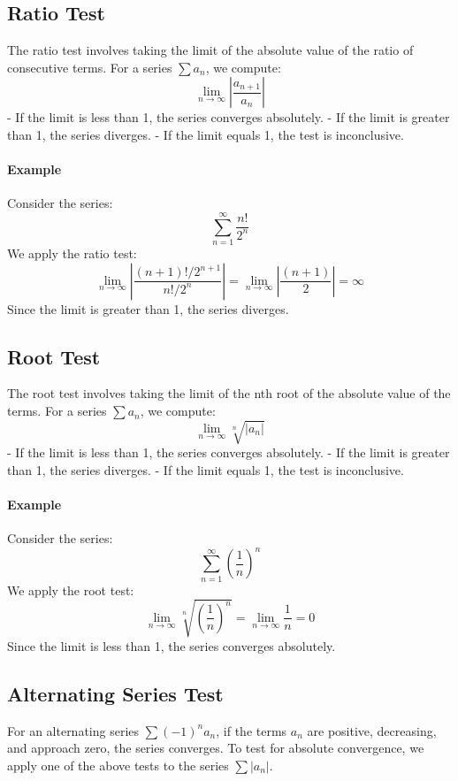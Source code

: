 \documentclass{article}
\begin{document}
\subsection*{Ratio Test}
The ratio test involves taking the limit of the absolute value of the ratio of consecutive terms. For a series \(\sum a_n\), we compute:
\[
\lim_{n \to \infty} \left| \frac{a_{n+1}}{a_n} \right|
\]
- If the limit is less than 1, the series converges absolutely.
- If the limit is greater than 1, the series diverges.
- If the limit equals 1, the test is inconclusive.

\paragraph{Example}
Consider the series:
\[
\sum_{n=1}^\infty \frac{n!}{2^n}
\]
We apply the ratio test:
\[
\lim_{n \to \infty} \left| \frac{(n+1)! / 2^{n+1}}{n! / 2^n} \right| = \lim_{n \to \infty} \left| \frac{(n+1)}{2} \right| = \infty
\]
Since the limit is greater than 1, the series diverges.

\subsection*{Root Test}
The root test involves taking the limit of the nth root of the absolute value of the terms. For a series \(\sum a_n\), we compute:
\[
\lim_{n \to \infty} \sqrt[n]{|a_n|}
\]
- If the limit is less than 1, the series converges absolutely.
- If the limit is greater than 1, the series diverges.
- If the limit equals 1, the test is inconclusive.

\paragraph{Example}
Consider the series:
\[
\sum_{n=1}^\infty \left( \frac{1}{n} \right)^n
\]
We apply the root test:
\[
\lim_{n \to \infty} \sqrt[n]{\left( \frac{1}{n} \right)^n} = \lim_{n \to \infty} \frac{1}{n} = 0
\]
Since the limit is less than 1, the series converges absolutely.

\subsection*{Alternating Series Test}
For an alternating series \(\sum (-1)^n a_n\), if the terms \(a_n\) are positive, decreasing, and approach zero, the series converges. To test for absolute convergence, we apply one of the above tests to the series \(\sum |a_n|\).
\end{document}
